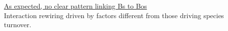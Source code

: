 \documentclass[11pt]{article}
\begin{document}
\begin{figure}[H]
  \label{fig:plant-bee}
\end{figure}

\underline{As expected, no clear pattern linking Bs to Bos} \\
Interaction rewiring driven by factors different from those driving species turnover. \\
\begin{figure}[H]
  \label{fig:plant-bee}
\end{figure}
\end{document}
